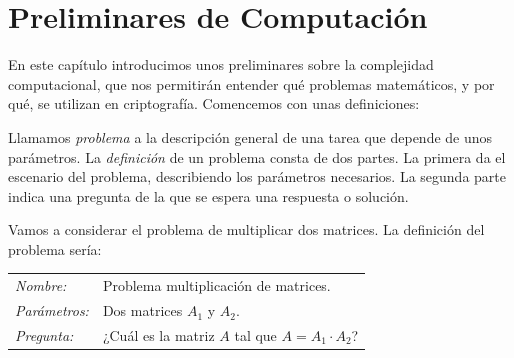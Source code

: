 \chapter{Preliminares de Computación}\label{ch:preliminaresComputacion}







En este capítulo introducimos unos preliminares sobre la complejidad computacional, que nos permitirán entender qué problemas matemáticos, y por qué, se utilizan en criptografía. Comencemos con unas definiciones:

\begin{definition}
	Llamamos \textit{problema} a la descripción general de una tarea que depende de unos parámetros. La \textit{definición} de un problema consta de dos partes. La primera da el escenario del problema, describiendo los parámetros necesarios. La segunda parte indica una pregunta de la que se espera una respuesta o solución.
\end{definition}

\begin{example}
	Vamos a considerar el problema de multiplicar dos matrices. La definición del problema sería:
	
	\begin{tabular}{|ll}
		\textit{Nombre:} & Problema multiplicación de matrices. \\
		\textit{Parámetros:} & Dos matrices $A_1$ y $A_2$. \\
		\textit{Pregunta:} & ¿Cuál es la matriz $A$ tal que $A=A_1 \cdot A_2$? \\
	\end{tabular}
\end{example}

